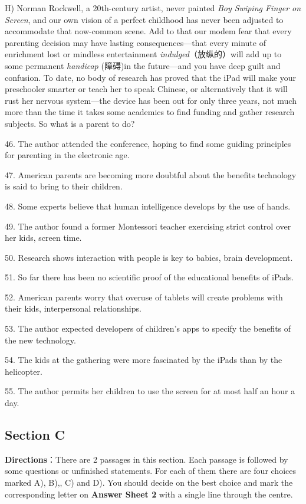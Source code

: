 \documentclass[UTF8,11pt]{ctexart}
\begin{document}
H) Norman Rockwell, a 20th-century artist, never painted\textit{ Boy Swiping Finger on Screen}, and our own vision of a perfect childhood has never been adjusted to accommodate that now-common scene. Add to that our modem fear that every parenting decision may have lasting consequences—that every minute of enrichment lost or mindless entertainment \textit{indulged}（放纵的）will add up to some permanent\textit{ handicap} (障碍)in the future—and you have deep guilt and confusion. To date, no body of research has proved that the iPad will make your preschooler smarter or teach her to speak Chinese, or alternatively that it will rust her nervous system—the device has been out for only three years, not much more than the time it takes some academics to find funding and gather research subjects. So what is a parent to do?


46. The author attended the conference, hoping to find some guiding principles for parenting in the electronic age.


47. American parents are becoming more doubtful about the benefits technology is said to bring to their children.


48. Some experts believe that human intelligence develops by the use of hands.


49. The author found a former Montessori teacher exercising strict control over her kids, screen time.


50. Research shows interaction with people is key to babies, brain development.


51. So far there has been no scientific proof of the educational benefits of iPads.


52. American parents worry that overuse of tablets will create problems with their kids, interpersonal relationships.


53. The author expected developers of children’s apps to specify the benefits of the new technology.


54. The kids at the gathering were more fascinated by the iPads than by the helicopter.


55. The author permits her children to use the screen for at most half an hour a day.


\subsection*{Section C}


\textbf{Directions}：There are 2 passages in this section. Each passage is followed by some questions or unfinished statements. For each of them there are four choices marked A), B),, C) and D). You should decide on the best choice and mark the corresponding letter on\textbf{ Answer Sheet 2} with a single line through the centre.
\end{document}
